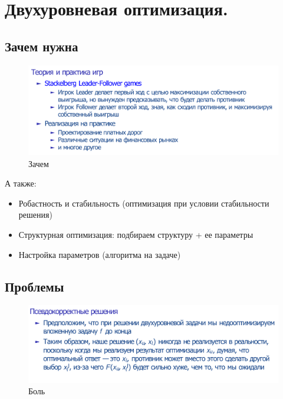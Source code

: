 \section{Двухуровневая оптимизация.}


\subsection*{Зачем нужна}

\begin{figure}[H]
    \centering
    \includegraphics[width=0.8\linewidth]{images/65why.png}
    \caption{Зачем}
\end{figure}

А также:
\begin{itemize}
    \item Робастность и стабильность (оптимизация при условии стабильности решения)
    \item Структурная оптимизация: подбираем структуру + ее параметры
    \item Настройка параметров (алгоритма на задаче)
\end{itemize}

\subsection*{Проблемы}

\begin{figure}[H]
    \centering
    \includegraphics[width=0.8\linewidth]{images/65pain.png}
    \caption{Боль}
\end{figure}

